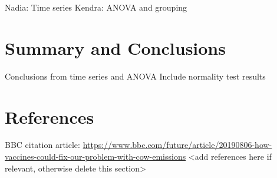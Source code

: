 \documentclass[
  12pt,
]{article}
\begin{document}
Nadia: Time series Kendra: ANOVA and grouping

\newpage

\hypertarget{summary-and-conclusions}{%
\section{Summary and Conclusions}\label{summary-and-conclusions}}

Conclusions from time series and ANOVA Include normality test results

\newpage

\hypertarget{references}{%
\section{References}\label{references}}

BBC citation article:
\url{https://www.bbc.com/future/article/20190806-how-vaccines-could-fix-our-problem-with-cow-emissions}
\textless add references here if relevant, otherwise delete this
section\textgreater{}
\end{document}
